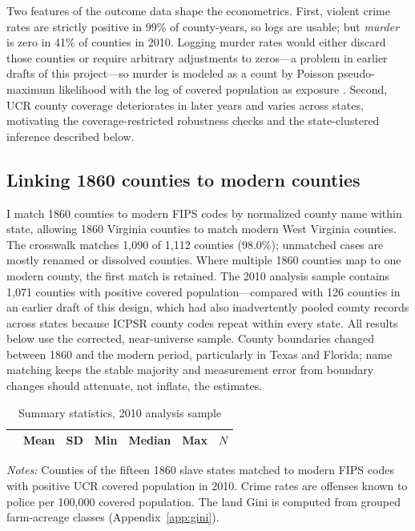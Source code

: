 \documentclass[12pt]{article}
\begin{document}
Two features of the outcome data shape the econometrics. First, violent crime rates are strictly positive in 99\% of county-years, so logs are usable; but \emph{murder} is zero in 41\% of counties in 2010. Logging murder rates would either discard those counties or require arbitrary adjustments to zeros---a problem in earlier drafts of this project---so murder is modeled as a count by Poisson pseudo-maximum likelihood with the log of covered population as exposure \citep{santossilva2006}. Second, UCR county coverage deteriorates in later years and varies across states, motivating the coverage-restricted robustness checks and the state-clustered inference described below.

\subsection{Linking 1860 counties to modern counties}

I match 1860 counties to modern FIPS codes by normalized county name within state, allowing 1860 Virginia counties to match modern West Virginia counties. The crosswalk matches 1,090 of 1,112 counties (98.0\%); unmatched cases are mostly renamed or dissolved counties. Where multiple 1860 counties map to one modern county, the first match is retained. The 2010 analysis sample contains 1,071 counties with positive covered population---compared with 126 counties in an earlier draft of this design, which had also inadvertently pooled county records across states because ICPSR county codes repeat within every state. All results below use the corrected, near-universe sample. County boundaries changed between 1860 and the modern period, particularly in Texas and Florida; name matching keeps the stable majority and measurement error from boundary changes should attenuate, not inflate, the estimates.

\begin{table}[H]
\centering
\caption{Summary statistics, 2010 analysis sample}
\label{tab:summary}
\begin{tabular}{lcccccc}
\toprule
 & Mean & SD & Min & Median & Max & $N$ \\
\midrule

\bottomrule
\end{tabular}
\par\smallskip
\footnotesize\textit{Notes:} Counties of the fifteen 1860 slave states matched to modern FIPS codes with positive UCR covered population in 2010. Crime rates are offenses known to police per 100,000 covered population. The land Gini is computed from grouped farm-acreage classes (Appendix~\ref{app:gini}).
\end{table}
\end{document}
